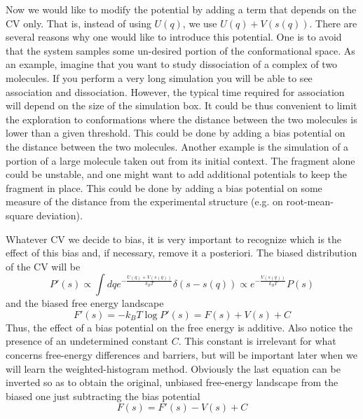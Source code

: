 Now we would like to modify the potential by adding a term that depends on the C\+V only. That is, instead of using $ U(q) $, we use $ U(q)+V(s(q))$. There are several reasons why one would like to introduce this potential. One is to avoid that the system samples some un-\/desired portion of the conformational space. As an example, imagine that you want to study dissociation of a complex of two molecules. If you perform a very long simulation you will be able to see association and dissociation. However, the typical time required for association will depend on the size of the simulation box. It could be thus convenient to limit the exploration to conformations where the distance between the two molecules is lower than a given threshold. This could be done by adding a bias potential on the distance between the two molecules. Another example is the simulation of a portion of a large molecule taken out from its initial context. The fragment alone could be unstable, and one might want to add additional potentials to keep the fragment in place. This could be done by adding a bias potential on some measure of the distance from the experimental structure (e.\+g. on root-\/mean-\/square deviation).

Whatever C\+V we decide to bias, it is very important to recognize which is the effect of this bias and, if necessary, remove it a posteriori. The biased distribution of the C\+V will be \[ P'(s)\propto \int dq e^{-\frac{U(q)+V(s(q))}{k_BT}} \delta(s-s(q))\propto e^{-\frac{V(s(q))}{k_BT}}P(s) \] and the biased free energy landscape \[ F'(s)=-k_B T \log P'(s)=F(s)+V(s)+C \] Thus, the effect of a bias potential on the free energy is additive. Also notice the presence of an undetermined constant $ C $. This constant is irrelevant for what concerns free-\/energy differences and barriers, but will be important later when we will learn the weighted-\/histogram method. Obviously the last equation can be inverted so as to obtain the original, unbiased free-\/energy landscape from the biased one just subtracting the bias potential \[ F(s)=F'(s)-V(s)+C \]

